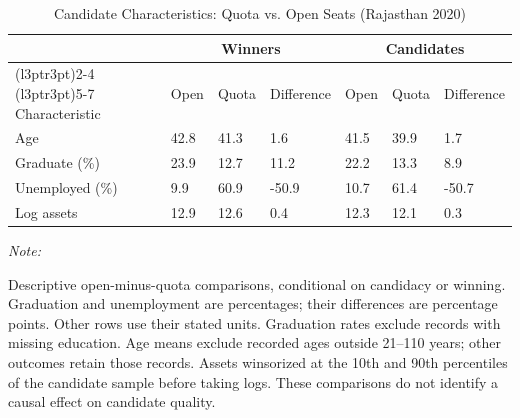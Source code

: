 \begin{table}
\centering
\caption{\label{tab:main_cand_char}Candidate Characteristics: Quota vs. Open Seats (Rajasthan 2020)}
\centering
\fontsize{8}{10}\selectfont
\begin{threeparttable}
\begin{tabular}[t]{lllllll}
\toprule
\multicolumn{1}{c}{ } & \multicolumn{3}{c}{Winners} & \multicolumn{3}{c}{Candidates} \\
\cmidrule(l{3pt}r{3pt}){2-4} \cmidrule(l{3pt}r{3pt}){5-7}
Characteristic & Open & Quota & Difference & Open & Quota & Difference\\
\midrule
Age & 42.8 & 41.3 & 1.6 & 41.5 & 39.9 & 1.7\\
Graduate (\%) & 23.9 & 12.7 & 11.2 & 22.2 & 13.3 & 8.9\\
Unemployed (\%) & 9.9 & 60.9 & -50.9 & 10.7 & 61.4 & -50.7\\
Log assets & 12.9 & 12.6 & 0.4 & 12.3 & 12.1 & 0.3\\
\bottomrule
\end{tabular}
\begin{tablenotes}
\item \textit{Note: } 
\item Descriptive open-minus-quota comparisons, conditional on candidacy or winning. Graduation and unemployment are percentages; their differences are percentage points. Other rows use their stated units. Graduation rates exclude records with missing education. Age means exclude recorded ages outside 21--110 years; other outcomes retain those records. Assets winsorized at the 10th and 90th percentiles of the candidate sample before taking logs. These comparisons do not identify a causal effect on candidate quality.
\end{tablenotes}
\end{threeparttable}
\end{table}
